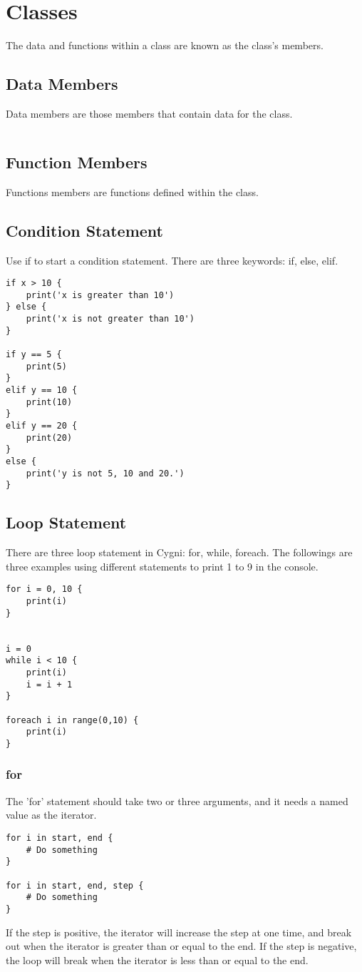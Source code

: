 \chapter{Classes}
The data and functions within a class are known as the class's members.
\section{Data Members}
Data members are those members that contain data for the class.
\begin{lstlisting}
\end{lstlisting}
\section{Function Members}
Functions members are functions defined within the class.

\section{Condition Statement}
Use if to start a condition statement. There are three keywords: if, else, elif.
\begin{lstlisting}
if x > 10 {
	print('x is greater than 10')
} else {
	print('x is not greater than 10')
}

if y == 5 {
	print(5)
}
elif y == 10 {
	print(10)
}
elif y == 20 {
	print(20)
}
else {
	print('y is not 5, 10 and 20.')
}
\end{lstlisting}

\section{Loop Statement}
	There are three loop statement in Cygni: for, while, foreach.
	The followings are three examples using different statements to print 1 to 9 in the console.
\begin{lstlisting}
for i = 0, 10 {
	print(i)
}


i = 0
while i < 10 {
	print(i)
	i = i + 1
}

foreach i in range(0,10) {
	print(i)
}
\end{lstlisting}

\subsection{for}
	The 'for' statement should take two or three arguments, and it needs a named value as the iterator.
\begin{lstlisting}
for i in start, end {
	# Do something
}

for i in start, end, step {
	# Do something
}
\end{lstlisting}
	If the step is positive, the iterator will increase the step at one time, and break out when the iterator is greater than or equal to the end. If the step is negative, the loop will break when the iterator is less than or equal to the end.
